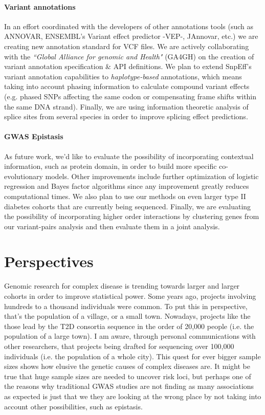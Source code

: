 \paragraph{Variant annotations} In an effort coordinated with the developers of other annotations tools (such as ANNOVAR, ENSEMBL’s Variant effect predictor -VEP-, JAnnovar, etc.) we are creating new annotation standard for VCF files. We are actively collaborating with the \textit{``Global Alliance for genomic and Health"} (GA4GH) on the creation of variant annotation specification \& API definitions. We plan to extend SnpEff's variant annotation capabilities to \textit{haplotype-based} annotations, which means taking into account phasing information to calculate compound variant effects (e.g. phased SNPs affecting the same codon or compensating frame shifts within the same DNA strand). Finally, we are using information theoretic analysis of splice sites from several species in order to improve splicing effect predictions.

\paragraph{GWAS Epistasis}
As future work, we'd like to evaluate the possibility of incorporating contextual information, such as protein domain, in order to build more specific co-evolutionary models. Other improvements include further optimization of logistic regression and Bayes factor algorithms since any improvement greatly reduces computational times. We also plan to use our methods on even larger type II diabetes cohorts that are currently being sequenced. Finally, we are evaluating the possibility of incorporating higher order interactions by clustering genes from our variant-pairs analysis and then evaluate them in a joint analysis.

\section{Perspectives}

Genomic research for complex disease is trending towards larger and larger cohorts in order to improve statistical power. Some years ago, projects involving hundreds to a thousand individuals were common. To put this in perspective, that’s the population of a village, or a small town. Nowadays, projects like the those lead by the T2D consortia sequence in the order of 20,000 people (i.e. the population of a large town). I am aware, through personal communications with other researchers, that projects being drafted for sequencing over 100,000 individuals (i.e. the population of a whole city). This quest for ever bigger sample sizes shows how elusive the genetic causes of complex diseases are. It might be true that huge sample sizes are needed to uncover risk loci, but perhaps one of the reasons why traditional GWAS studies are not finding as many associations as expected is just that we they are looking at the wrong place by not taking into account other possibilities, such as epistasis.
